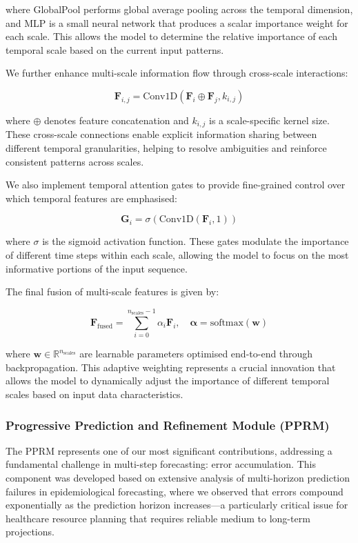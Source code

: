 \documentclass[lettersize, journal]{IEEEtran}
\begin{document}
where GlobalPool performs global average pooling across the temporal dimension, and MLP is a small neural network that produces a scalar importance weight for each scale. This allows the model to determine the relative importance of each temporal scale based on the current input patterns.

We further enhance multi-scale information flow through cross-scale interactions:

\begin{equation}
\mathbf{F}_{i,j} = \text{Conv1D}(\mathbf{F}_i \oplus \mathbf{F}_j, k_{i,j})
\end{equation}

where $\oplus$ denotes feature concatenation and $k_{i,j}$ is a scale-specific kernel size. These cross-scale connections enable explicit information sharing between different temporal granularities, helping to resolve ambiguities and reinforce consistent patterns across scales.

We also implement temporal attention gates to provide fine-grained control over which temporal features are emphasised:

\begin{equation}
\mathbf{G}_i = \sigma(\text{Conv1D}(\mathbf{F}_i, 1))
\end{equation}

where $\sigma$ is the sigmoid activation function. These gates modulate the importance of different time steps within each scale, allowing the model to focus on the most informative portions of the input sequence.

The final fusion of multi-scale features is given by:

\begin{equation}
\mathbf{F}_{\text{fused}} = \sum_{i=0}^{n_{\text{scales}}-1} \alpha_i \mathbf{F}_i, \quad \boldsymbol{\alpha} = \text{softmax}(\mathbf{w})
\end{equation}

where $\mathbf{w} \in \mathbb{R}^{n_{\text{scales}}}$ are learnable parameters optimised end-to-end through backpropagation. This adaptive weighting represents a crucial innovation that allows the model to dynamically adjust the importance of different temporal scales based on input data characteristics.

\subsubsection{Progressive Prediction and Refinement Module (PPRM)}
The PPRM represents one of our most significant contributions, addressing a fundamental challenge in multi-step forecasting: error accumulation. This component was developed based on extensive analysis of multi-horizon prediction failures in epidemiological forecasting, where we observed that errors compound exponentially as the prediction horizon increases—a particularly critical issue for healthcare resource planning that requires reliable medium to long-term projections.
\end{document}
